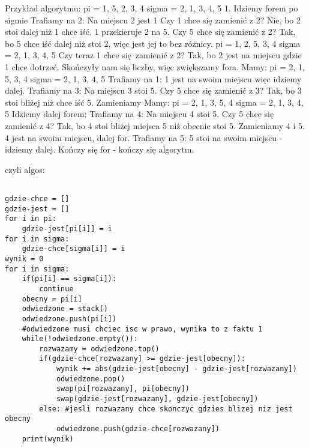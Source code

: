 \documentclass[12pt]{article}
\begin{document}
Przykład algorytmu:
pi = {1, 5, 2, 3, 4}
sigma = {2, 1, 3, 4, 5}
1. Idziemy forem po sigmie
Trafiamy na 2:
Na miejscu 2 jest 1 
Czy 1 chce się zamienić z 2? Nie, bo 2 stoi dalej niż 1 chce iść. 
1 przekieruje 2 na 5.
Czy 5 chce się zamienić z 2? Tak, bo 5 chce iść dalej niż stoi 2, więc jest jej to bez różnicy.
pi = {1, 2, 5, 3, 4}
sigma = {2, 1, 3, 4, 5}
Czy teraz 1 chce się zamienić z 2? Tak, bo 2 jest na miejscu gdzie 1 chce dotrzeć.
Skończyły nam się liczby, więc zwiększamy fora.
Mamy:
pi = {2, 1, 5, 3, 4}
sigma = {2, 1, 3, 4, 5}
Trafiamy na 1:
1 jest na swoim miejscu więc idziemy dalej.
Trafiamy na 3:
Na miejscu 3 stoi 5.
Czy 5 chce się zamienić z 3? Tak, bo 3 stoi bliżej niż chce iść 5.
Zamieniamy
Mamy:
pi = {2, 1, 3, 5, 4}
sigma = {2, 1, 3, 4, 5}
Idziemy dalej forem:
Trafiamy na 4:
Na miejscu 4 stoi 5.
Czy 5 chce się zamienić z 4?
Tak, bo 4 stoi bliżej miejsca 5 niż obecnie stoi 5.
Zamieniamy 4 i 5.
4 jest na swoim miejscu, dalej for.
Trafiamy na 5:
5 stoi na swoim miejscu - idziemy dalej.
Kończy się for - kończy się algorytm.


czyli algos:
\begin{lstlisting}

gdzie-chce = []
gdzie-jest = []
for i in pi:
    gdzie-jest[pi[i]] = i
for i in sigma:
    gdzie-chce[sigma[i]] = i 
wynik = 0
for i in sigma:
    if(pi[i] == sigma[i]):
        continue 
    obecny = pi[i]
    odwiedzone = stack() 
    odwiedzone.push(pi[i])
    #odwiedzone musi chciec isc w prawo, wynika to z faktu 1
    while(!odwiedzone.empty()):
        rozwazamy = odwiedzone.top()
        if(gdzie-chce[rozwazany] >= gdzie-jest[obecny]):
            wynik += abs(gdzie-jest[obecny] - gdzie-jest[rozwazany])
            odwiedzone.pop()
            swap(pi[rozwazany], pi[obecny])
            swap(gdzie-jest[rozwazany], gdzie-jest[obecny])
        else: #jesli rozwazany chce skonczyc gdzies blizej niz jest obecny
            odwiedzone.push(gdzie-chce[rozwazany])
    print(wynik)
\end{lstlisting}
\end{document}
